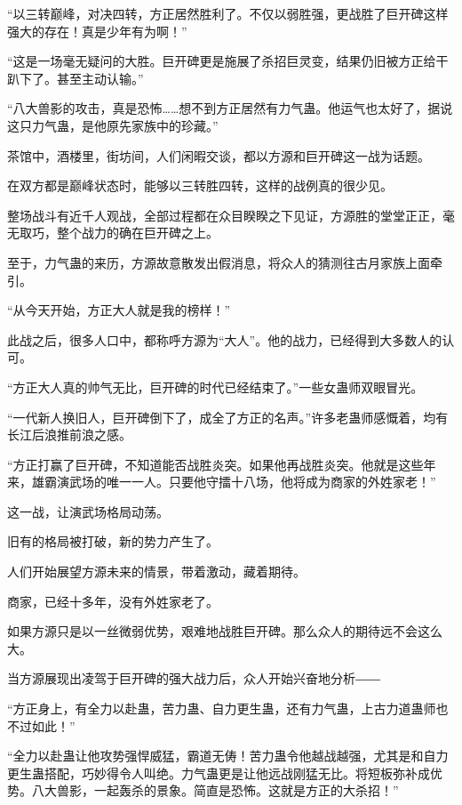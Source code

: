 
\begin{this_body}

“以三转巅峰，对决四转，方正居然胜利了。不仅以弱胜强，更战胜了巨开碑这样强大的存在！真是少年有为啊！”

“这是一场毫无疑问的大胜。巨开碑更是施展了杀招巨灵变，结果仍旧被方正给干趴下了。甚至主动认输。”

“八大兽影的攻击，真是恐怖……想不到方正居然有力气蛊。他运气也太好了，据说这只力气蛊，是他原先家族中的珍藏。”

茶馆中，酒楼里，街坊间，人们闲暇交谈，都以方源和巨开碑这一战为话题。

在双方都是巅峰状态时，能够以三转胜四转，这样的战例真的很少见。

整场战斗有近千人观战，全部过程都在众目睽睽之下见证，方源胜的堂堂正正，毫无取巧，整个战力的确在巨开碑之上。

至于，力气蛊的来历，方源故意散发出假消息，将众人的猜测往古月家族上面牵引。

“从今天开始，方正大人就是我的榜样！”

此战之后，很多人口中，都称呼方源为“大人”。他的战力，已经得到大多数人的认可。

“方正大人真的帅气无比，巨开碑的时代已经结束了。”一些女蛊师双眼冒光。

“一代新人换旧人，巨开碑倒下了，成全了方正的名声。”许多老蛊师感慨着，均有长江后浪推前浪之感。

“方正打赢了巨开碑，不知道能否战胜炎突。如果他再战胜炎突。他就是这些年来，雄霸演武场的唯一一人。只要他守擂十八场，他将成为商家的外姓家老！”

这一战，让演武场格局动荡。

旧有的格局被打破，新的势力产生了。

人们开始展望方源未来的情景，带着激动，藏着期待。

商家，已经十多年，没有外姓家老了。

如果方源只是以一丝微弱优势，艰难地战胜巨开碑。那么众人的期待远不会这么大。

当方源展现出凌驾于巨开碑的强大战力后，众人开始兴奋地分析――

“方正身上，有全力以赴蛊，苦力蛊、自力更生蛊，还有力气蛊，上古力道蛊师也不过如此！”

“全力以赴蛊让他攻势强悍威猛，霸道无俦！苦力蛊令他越战越强，尤其是和自力更生蛊搭配，巧妙得令人叫绝。力气蛊更是让他远战刚猛无比。将短板弥补成优势。八大兽影，一起轰杀的景象。简直是恐怖。这就是方正的大杀招！”


\end{this_body}
